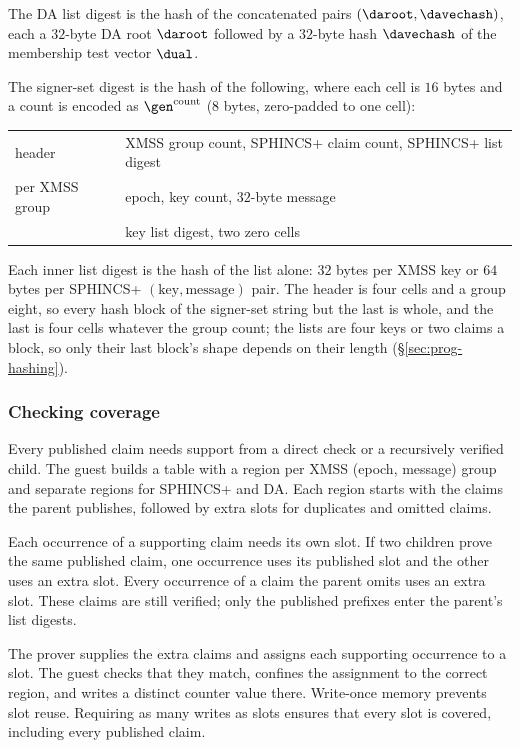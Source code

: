The DA list digest is the hash of the concatenated pairs $(\daroot,\davechash)$, each a $32$-byte DA root $\daroot$ followed by a $32$-byte hash $\davechash$ of the membership test vector $\dual$.

The signer-set digest is the hash of the following, where each cell is $16$ bytes and a count is encoded as $\gen^{\text{count}}$ (8 bytes, zero-padded to one cell):
\begin{center}
\begin{tabular}{@{}ll@{}}
\hline
header & XMSS group count, SPHINCS+ claim count, SPHINCS+ list digest\\
per XMSS group & epoch, key count, $32$-byte message\\
& key list digest, two zero cells\\
\hline
\end{tabular}
\end{center}
Each inner list digest is the hash of the list alone: $32$ bytes per XMSS key or $64$ bytes per SPHINCS+ $(\text{key},\text{message})$ pair. The header is four cells and a group eight, so every hash block of the signer-set string but the last is whole, and the last is four cells whatever the group count; the lists are four keys or two claims a block, so only their last block's shape depends on their length (\S\ref{sec:prog-hashing}).

\subsubsection{Checking coverage}

Every published claim needs support from a direct check or a recursively verified child. The guest builds a table with a region per XMSS (epoch, message) group and separate regions for SPHINCS+ and DA. Each region starts with the claims the parent publishes, followed by extra slots for duplicates and omitted claims.

Each occurrence of a supporting claim needs its own slot. If two children prove the same published claim, one occurrence uses its published slot and the other uses an extra slot. Every occurrence of a claim the parent omits uses an extra slot. These claims are still verified; only the published prefixes enter the parent's list digests.

The prover supplies the extra claims and assigns each supporting occurrence to a slot. The guest checks that they match, confines the assignment to the correct region, and writes a distinct counter value there. Write-once memory prevents slot reuse. Requiring as many writes as slots ensures that every slot is covered, including every published claim.


